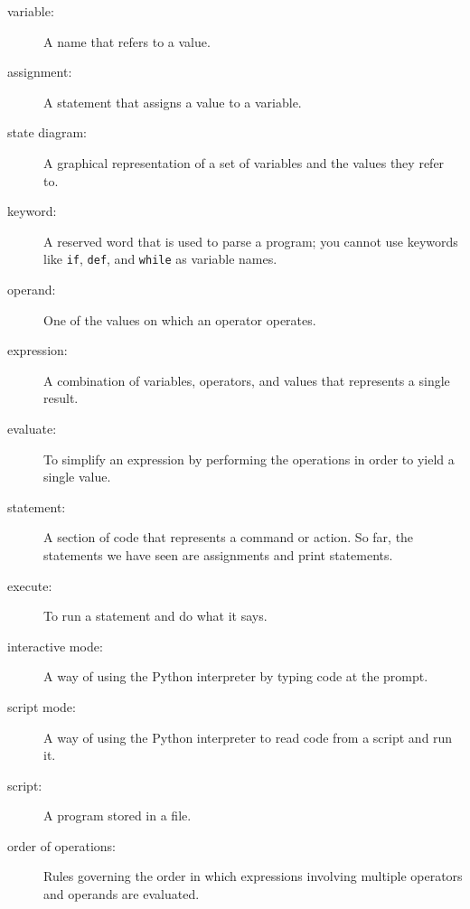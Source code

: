 \documentclass[10pt]{book}
\begin{document}
\begin{description}

\item[variable:]  A name that refers to a value.

\item[assignment:]  A statement that assigns a value to a variable.

\item[state diagram:]  A graphical representation of a set of variables and the
values they refer to.

\item[keyword:]  A reserved word that is used to parse a
program; you cannot use keywords like {\tt if}, {\tt  def}, and {\tt while} as
variable names.

\item[operand:]  One of the values on which an operator operates.

\item[expression:]  A combination of variables, operators, and values that
represents a single result.

\item[evaluate:]  To simplify an expression by performing the operations
in order to yield a single value.

\item[statement:]  A section of code that represents a command or action.  So
far, the statements we have seen are assignments and print statements.

\item[execute:]  To run a statement and do what it says.

\item[interactive mode:] A way of using the Python interpreter by
typing code at the prompt.

\item[script mode:] A way of using the Python interpreter to read
code from a script and run it.

\item[script:] A program stored in a file.

\item[order of operations:]  Rules governing the order in which
expressions involving multiple operators and operands are evaluated.


\end{description}
\end{document}
